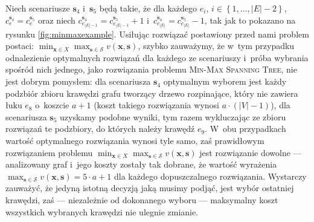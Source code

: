 Niech scenariusze $\textbf{s}_{4}$ i~$\textbf{s}_{5}$ będą takie, że dla każdego $e_{i}$, $i \in \left\{ 1, \dots, \left| E \right| - 2 \right\}$, $c^{\textbf{s}_{4}}_{e} = c^{\textbf{s}_{5}}_{e}$ oraz niech $c^{\textbf{s}_{4}}_{e_{\left| E \right| - 1}} = c^{\textbf{s}_{5}}_{e_{\left| E \right| - 1}} + 1$ i~$c^{\textbf{s}_{4}}_{e_{\left| E \right|}} = c^{\textbf{s}_{5}}_{e_{\left| E \right|}} - 1$, tak jak to pokazano na rysunku \ref{fig:minmaxexample}.
Usiłując rozwiązać postawiony przed nami problem postaci: $\min_{\textbf{x} \in X} \max_{\textbf{s} \in \mathcal{S}} v \left( \textbf{x}, \textbf{s} \right)$, szybko zauważymy, że w~tym przypadku odnalezienie optymalnych rozwiązań dla każdego ze scenariuszy i~próba wybrania spośród nich jednego, jako rozwiązania problemu \textsc{Min-Max Spanning Tree}, nie jest dobrym pomysłem: dla scenariusza $\textbf{s}_{4}$ optymalnym wyborem jest każdy podzbiór zbioru krawędzi grafu tworzący drzewo rozpinające, który nie zawiera łuku $e_{8}$ o~koszcie $a+1$ (koszt takiego rozwiązania wynosi $a \cdot \left( \left| V \right| - 1 \right)$), dla scenariusza $\textbf{s}_{5}$ uzyskamy podobne wyniki, tym razem wykluczając ze zbioru rozwiązań te podzbiory, do których należy krawędź $e_{9}$.
W~obu przypadkach wartość optymalnego rozwiązania wynosi tyle samo, zaś prawidłowym rozwiązaniem problemu $\min_{\textbf{x} \in X} \max_{\textbf{s} \in \mathcal{S}} v \left( \textbf{x}, \textbf{s} \right)$ jest rozwiązanie dowolne --- analizowany graf i~jego koszty zostały tak dobrane, że wartość wyrażenia $\max_{\textbf{s} \in \mathcal{S}} v \left( \textbf{x}, \textbf{s} \right) = 5 \cdot a + 1$ dla każdego dopuszczalnego rozwiązania.
Wystarczy zauważyć, że jedyną istotną decyzją jaką musimy podjąć, jest wybór ostatniej krawędzi, zaś --- niezależnie od dokonanego wyboru --- maksymalny koszt wszystkich wybranych krawędzi nie ulegnie zmianie.


